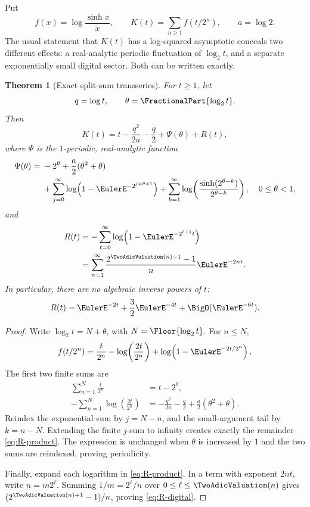 \documentclass[11pt,oneside]{article}
\newtheorem{theorem}{Theorem}[section]
\theoremstyle{definition}
\theoremstyle{remark}
\begin{document}
Put
\[
 f(x)=\log\frac{\sinh x}{x},
 \qquad
 K(t)=\sum_{n\geq1}f(t/2^n),
 \qquad a=\log2.
\]
The usual statement that \(K(t)\) has a log-squared asymptotic conceals two
different effects: a real-analytic periodic fluctuation of \(\log_2t\), and a
separate exponentially small digital sector.  Both can be written exactly.

\begin{theorem}[Exact split-sum transseries]
\label{thm:exact-transseries}
For \(t\geq1\), let
\[
 q=\log t,\qquad \theta=\FractionalPart{\log_2t}.
\]
Then
\begin{equation}
 \boxed{\displaystyle
 K(t)
 =t-\frac{q^2}{2a}-\frac q2+\Psi(\theta)+R(t),}
 \label{eq:K-transseries}
\end{equation}
where \(\Psi\) is the \(1\)-periodic, real-analytic function
\begin{align}
 \Psi(\theta)
 ={}&
 -2^\theta+\frac a2(\theta^2+\theta)
 \notag\\
 &+\sum_{j=0}^{\infty}
   \log\!\left(1-\EulerE^{-2^{j+\theta+1}}\right)
 +\sum_{k=1}^{\infty}
   \log\!\left(
    \frac{\sinh(2^{\theta-k})}{2^{\theta-k}}
   \right),
 \quad 0\leq\theta<1,
 \label{eq:Psi-split}
\end{align}
and
\begin{align}
 R(t)
 &=-\sum_{\ell=0}^{\infty}
   \log\!\left(1-\EulerE^{-2^{\ell+1}t}\right)
 \label{eq:R-product}\\
 &=\sum_{n=1}^{\infty}
   \frac{2^{\TwoAdicValuation(n)+1}-1}{n}\EulerE^{-2nt}.
 \label{eq:R-digital}
\end{align}
In particular, there are no algebraic inverse powers of \(t\):
\[
 R(t)=\EulerE^{-2t}+\frac32\EulerE^{-4t}+\BigO(\EulerE^{-6t}).
\]
\end{theorem}

\begin{proof}
Write \(\log_2t=N+\theta\), with \(N=\Floor{\log_2t}\).  For \(n\leq N\),
\[
 f(t/2^n)
 =\frac{t}{2^n}
  -\log\!\left(\frac{2t}{2^n}\right)
  +\log\!\left(1-\EulerE^{-2t/2^n}\right).
\]
The first two finite sums are
\begin{align*}
 \sum_{n=1}^{N}\frac{t}{2^n}&=t-2^\theta,\\
 -\sum_{n=1}^{N}\log\!\left(\frac{2t}{2^n}\right)
 &=-\frac{q^2}{2a}-\frac q2+\frac a2(\theta^2+\theta).
\end{align*}
Reindex the exponential sum by \(j=N-n\), and the small-argument tail by
\(k=n-N\).  Extending the finite \(j\)-sum to infinity creates exactly the
remainder \eqref{eq:R-product}.  The expression is unchanged when
\(\theta\) is increased by \(1\) and the two sums are reindexed, proving
periodicity.

Finally, expand each logarithm in \eqref{eq:R-product}.  In a term with
exponent \(2nt\), write \(n=m2^\ell\).  Summing \(1/m=2^\ell/n\) over
\(0\leq\ell\leq\TwoAdicValuation(n)\) gives
\((2^{\TwoAdicValuation(n)+1}-1)/n\), proving \eqref{eq:R-digital}.
\end{proof}
\end{document}
